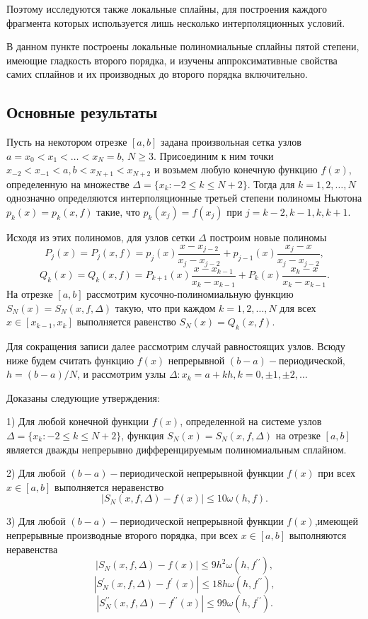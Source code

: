 Поэтому исследуются также локальные сплайны, для построения каждого фрагмента
которых используется лишь несколько интерполяционных условий.

В данном пункте построены локальные полиномиальные сплайны пятой степени,
имеющие гладкость второго порядка, и изучены аппроксимативные свойства самих
сплайнов и их производных до второго порядка включительно.


\subsection{Основные результаты}

Пусть на некотором отрезке $[a,b]$ задана произвольная сетка узлов
$a=x_0<x_1<\dots <x_N=b$,  $N\geqslant 3$. Присоединим к ним точки
$ x_{-2}<x_{-1}<a, b<x_{N+1}<x_{N+2}$ и возьмем любую конечную функцию $f(x)$,
определенную на множестве $\Delta=\{x_k: -2\leqslant k \leqslant N+2\}$.
Тогда для $k=1,2,…,N$ однозначно определяются интерполяционные третьей степени
 полиномы Ньютона $p_k (x)=p_k (x,f)$
такие, что  $p_k (x_j )=f(x_j)$ при $j=k-2,k-1,k,k+1$.

Исходя из этих полиномов, для узлов сетки $\Delta$ построим новые полиномы
$$
P_j (x)=P_j (x,f)=p_j (x) \frac{x-x_{j-2}}{x_j-x_{j-2}}+
p_{j-1}(x)\frac{x_j-x}{x_j-x_{j-2}},
$$
$$
Q_k (x)=Q_k (x,f)=P_{k+1}(x)\frac{x-x_{k-1}}{x_k-x_{k-1}}+
P_k (x)\frac{x_k-x}{x_k-x_{k-1}}.
$$
На отрезке $[a,b]$  рассмотрим кусочно-полиномиальную функцию
 $S_N (x)=S_N (x,f,\Delta)$ такую, что при каждом $k=1,2,…,N$
для всех $x\in [x_{k-1},x_k]$ выполняется равенство $S_N (x)=Q_k (x,f)$.

Для сокращения записи далее рассмотрим случай равностоящих узлов.
Всюду ниже будем считать функцию $f(x)$ непрерывной $(b-a)-$периодической,
$h=(b-a)/N$, и рассмотрим узлы $\Delta:x_k=a+kh,k=0,±1,±2,…$

Доказаны следующие утверждения:

1) Для любой конечной функции $f(x)$, определенной на системе узлов
$\Delta=\{x_k:-2\leqslant k \leqslant N+2\}$, функция
$S_N (x)=S_N (x,f,\Delta)$ на отрезке $[a,b]$
является дважды непрерывно дифференцируемым полиномиальным сплайном.

2) Для любой $(b-a)-$периодической непрерывной функции $f(x)$
при всех $x\in [a,b]$ выполняется неравенство
$$
|S_N (x,f,\Delta)-f(x)|\leqslant 10 \omega(h,f).
$$

3) Для любой $(b-a)-$периодической непрерывной функции $f(x)$,имеющей
непрерывные производные второго порядка, при всех $x\in [a,b]$ выполняются
неравенства
$$
|S_N (x,f,\Delta)-f(x)|\leqslant 9h^2 \omega(h,f^{\prime\prime}),
$$
$$
|S_N^\prime(x,f,\Delta)-f^\prime(x)|\leqslant 18h\omega(h,f^{\prime\prime}),
$$
$$
|S_N^{\prime\prime}(x,f,\Delta)-f^{\prime\prime}(x)|\leqslant 99\omega(h,f^{\prime\prime}).
$$


